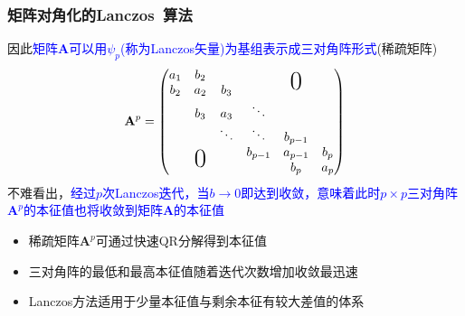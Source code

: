 \frame
{
	\frametitle{矩阵对角化的\textrm{Lanczos~}算法}
	因此\textcolor{blue}{矩阵$\mathbf{A}$可以用$\psi_p$(称为\textrm{Lanczos}矢量)为基组表示成三对角阵形式}(稀疏矩阵)
	\begin{displaymath}
		\mathbf{A}^p=\begin{pmatrix}
			a_1 & b_2 & & & & \\
			b_2 & a_2 &b_3 & &\raisebox{0.8ex}[0pt]{\huge{0}} &\\
&b_3 &a_3 &\ddots & & \\
& &\ddots &\ddots &b_{p-1} & \\
& & &b_{p-1} &a_{p-1} &b_{p}\\
&\raisebox{0.8ex}[0pt]{\huge{0}} & & &b_{p} &a_{p}
		\end{pmatrix}
	\end{displaymath}
	不难看出，\textcolor{blue}{经过$p$次\textrm{Lanczos}迭代，当$b\rightarrow0$即达到收敛，意味着此时$p\times p$三对角阵$\mathbf{A}^p$的本征值也将收敛到矩阵$\mathbf{A}$的本征值}
	\begin{itemize}
		\item 稀疏矩阵$\mathbf{A}^p$可通过快速\textrm{QR}分解得到本征值
		\item 三对角阵的最低和最高本征值随着迭代次数增加收敛最迅速
		\item \textrm{Lanczos}方法适用于少量本征值与剩余本征有较大差值的体系
	\end{itemize}
}

